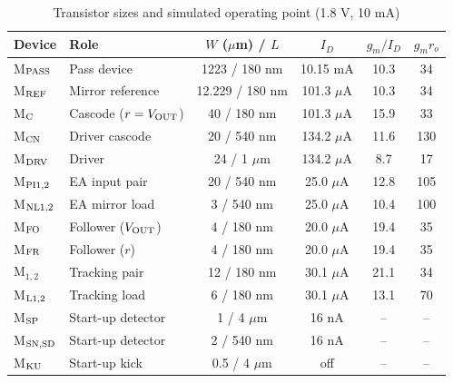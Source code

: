\begin{table}[!t]
\centering
\caption{Transistor sizes and simulated operating point (1.8 V, 10 mA)}
\label{tab:sizing}
\footnotesize
\setlength{\tabcolsep}{1.6pt}
\begin{tabular}{@{}llcccc@{}}
\toprule
Device & Role & $W$ ($\mu$m) / $L$ & $I_D$ & $g_m/I_D$ & $g_mr_o$ \\
\midrule
M$_{\rm PASS}$ & Pass device & 1223 / 180 nm & 10.15 mA & 10.3 & 34 \\
M$_{\rm REF}$ & Mirror reference & 12.229 / 180 nm & 101.3 $\mu$A & 10.3 & 34 \\
M$_{\rm C}$ & Cascode ($r=V_{\rm OUT}$) & 40 / 180 nm & 101.3 $\mu$A & 15.9 & 33 \\
M$_{\rm CN}$ & Driver cascode & 20 / 540 nm & 134.2 $\mu$A & 11.6 & 130 \\
M$_{\rm DRV}$ & Driver & 24 / 1 $\mu$m & 134.2 $\mu$A & 8.7 & 17 \\
M$_{\rm PI1,2}$ & EA input pair & 20 / 540 nm & 25.0 $\mu$A & 12.8 & 105 \\
M$_{\rm NL1,2}$ & EA mirror load & 3 / 540 nm & 25.0 $\mu$A & 10.4 & 100 \\
M$_{\rm FO}$ & Follower ($V_{\rm OUT}$) & 4 / 180 nm & 20.0 $\mu$A & 19.4 & 35 \\
M$_{\rm FR}$ & Follower ($r$) & 4 / 180 nm & 20.0 $\mu$A & 19.4 & 35 \\
M$_{1,2}$ & Tracking pair & 12 / 180 nm & 30.1 $\mu$A & 21.1 & 34 \\
M$_{\rm L1,2}$ & Tracking load & 6 / 180 nm & 30.1 $\mu$A & 13.1 & 70 \\
\midrule
M$_{\rm SP}$ & Start-up detector & 1 / 4 $\mu$m & 16 nA & -- & -- \\
M$_{\rm SN,SD}$ & Start-up detector & 2 / 540 nm & 16 nA & -- & -- \\
M$_{\rm KU}$ & Start-up kick & 0.5 / 4 $\mu$m & off & -- & -- \\
\bottomrule
\end{tabular}
\end{table}
